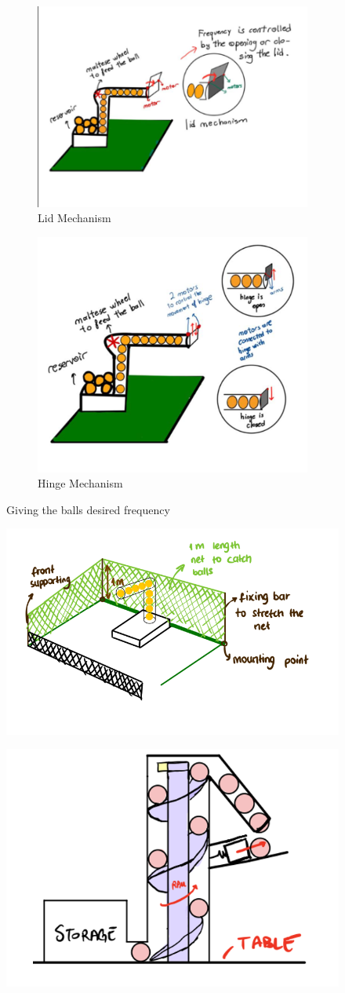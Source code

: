 \documentclass[12pt]{article}
\begin{document}
\begin{figure}[H]
\begin{subfigure}{.5\textwidth}
  \centering
  \includegraphics[width=.4\linewidth]{lid.png}
  \caption{Lid Mechanism}
  \label{fig:lid_mechanism}
\end{subfigure}%
\begin{subfigure}{.5\textwidth}
  \centering
  \includegraphics[width=.4\linewidth]{hinge.png}
  \caption{Hinge Mechanism}
  \label{fig:hinge_mechanism}
\end{subfigure}%


\caption{Giving the balls desired frequency}
\label{fig:giving_frequency}
\end{figure}

\begin{figure}[H]
\centering
\begin{minipage}{.5\textwidth}
  \centering
  \includegraphics[width=.4\linewidth]{Function photos/net.png}
  \label{fig:net}
\end{minipage}%
\begin{minipage}{.5\textwidth}
  \centering
  \includegraphics[width=.4\linewidth]{Function photos/gravity.png}
  \label{fig:gravity}
\end{minipage}
\end{figure}
\end{document}
